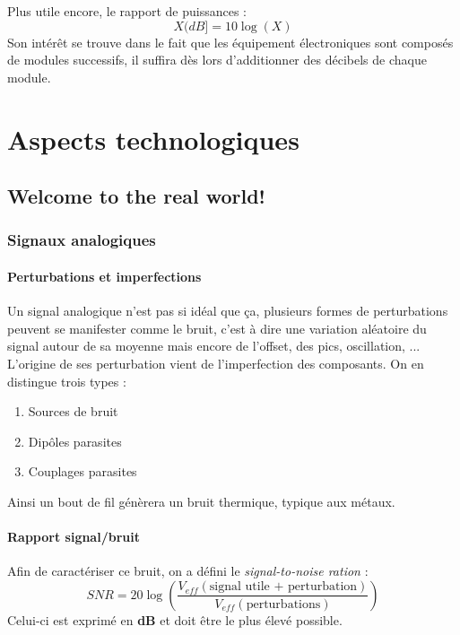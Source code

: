 \documentclass	[11pt, a4paper, openany]{book}
\begin{document}
Plus utile encore, le rapport de puissances :
\begin{equation}
X(dB] = 10\log(X)
\end{equation}
Son intérêt se trouve dans le fait que les équipement électroniques sont composés de modules successifs, il suffira dès lors d'additionner des décibels de chaque module.



\part{Aspects technologiques}
\setcounter{chapter}{2}
\chapter{Welcome to the real world!}

\section{Signaux analogiques}
\subsection{Perturbations et imperfections}
Un signal analogique n'est pas si idéal que ça, plusieurs formes de perturbations peuvent se manifester comme le bruit, c'est à dire une variation aléatoire du signal autour de sa moyenne mais encore de l'offset, des pics, oscillation, ...\\
L'origine de ses perturbation vient de l'imperfection des composants. On en distingue trois types :
\begin{enumerate}
\item Sources de bruit
\item Dipôles parasites
\item Couplages parasites
\end{enumerate}
Ainsi un bout de fil génèrera un bruit thermique, typique aux métaux.

\subsection{Rapport signal/bruit}
Afin de caractériser ce bruit, on a défini le \textit{signal-to-noise ration} :
\begin{equation}
SNR = 20\log\left(\dfrac{V_{eff}(\text{signal utile + perturbation})}{V_{eff}(\text{perturbations})} \right)
\end{equation}
Celui-ci est exprimé en \textbf{dB} et doit être le plus élevé possible.
\end{document}
